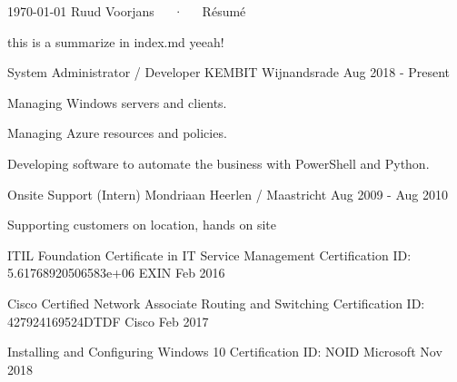 \documentclass[11pt, letterpaper]{awesome-cv}
\begin{document}
\makecvheader[C]

\makecvfooter
  {\today}
  {Ruud Voorjans~~~·~~~Résumé}
  {\thepage}

\begin{cvparagraph}

this is a summarize in index.md yeeah!


\end{cvparagraph}

\begin{cventries}


  \cventry
    {System Administrator / Developer}
    {KEMBIT}
    {Wijnandsrade}
    {Aug 2018 - Present}
    {
      \begin{cvitems}
        \item{Managing Windows servers and clients.}
        \item{Managing Azure resources and policies.}
        \item{Developing software to automate the business with PowerShell and Python.}
      \end{cvitems}
    }


  \cventry
    {Onsite Support (Intern)}
    {Mondriaan}
    {Heerlen / Maastricht}
    {Aug 2009 - Aug 2010}
    {
      \begin{cvitems}
        \item{Supporting customers on location, hands on site}
      \end{cvitems}
    }



\end{cventries}

\begin{cvhonors}

  \cvhonor
    {ITIL Foundation Certificate in IT Service Management}
    {Certification ID: 5.61768920506583e+06}
    {EXIN}
    {Feb 2016}

  \cvhonor
    {Cisco Certified Network Associate Routing and Switching}
    {Certification ID: 427924169524DTDF}
    {Cisco}
    {Feb 2017}

  \cvhonor
    {Installing and Configuring Windows 10}
    {Certification ID: NOID}
    {Microsoft}
    {Nov 2018}


\end{cvhonors}
\end{document}
